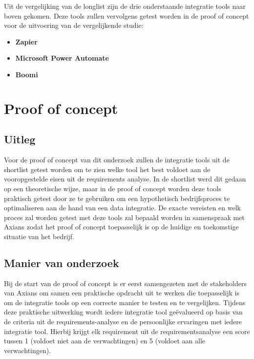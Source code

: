 \vspace{\baselineskip}

Uit de vergelijking van de longlist zijn de drie onderstaande integratie tools naar boven gekomen. Deze tools zullen vervolgens getest worden in de proof of concept voor de uitvoering van de vergelijkende studie:

\begin{itemize}
    \item \textbf{Zapier}
    \item \textbf{Microsoft Power Automate}
    \item \textbf{Boomi}
\end{itemize}


\section{Proof of concept}
\label{sec:Proof of conceptBP}

\subsection{Uitleg}
\label{sec:UitlegBP}

Voor de proof of concept van dit onderzoek zullen de integratie tools uit de shortlist getest worden om te zien welke tool het best voldoet aan de vooropgestelde eisen uit de requirements analyse. In de shortlist werd dit gedaan op een theoretische wijze, maar in de proof of concept worden deze tools praktisch getest door ze te gebruiken om een hypothetisch bedrijfsproces te optimaliseren aan de hand van een data integratie. De exacte vereisten en welk proces zal worden getest met deze tools zal bepaald worden in samenspraak met Axians zodat het proof of concept toepasselijk is op de huidige en toekomstige situatie van het bedrijf.

\subsection{Manier van onderzoek}
\label{sec:Manier van onderzoekBP}

Bij de start van de proof of concept is er eerst samengezeten met de stakeholders van Axians om samen een praktische opdracht uit te werken die toepasselijk is om de integratie tools op een correcte manier te testen en te vergelijken. Tijdens deze praktische uitwerking wordt iedere integratie tool geëvalueerd op basis van de criteria uit de requirements-analyse en de persoonlijke ervaringen met iedere integratie tool. Hierbij krijgt elk requirement uit de requirementsanalyse een score tussen 1 (voldoet niet aan de verwachtingen) en 5 (voldoet aan alle verwachtingen).

